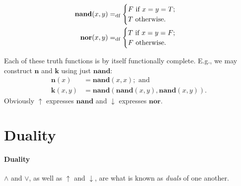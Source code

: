 \begin{definition}
	\begin{align*}
		\mathbf{nand}(x,y) =_{\text{df}} \begin{cases}
			F \text{ if } x=y=T;\\
			T \text{ otherwise}.
		\end{cases}\\
		\mathbf{nor}(x,y) =_{\text{df}} \begin{cases}
			T \text{ if } x=y=F;\\
			F \text{ otherwise}.
		\end{cases}
	\end{align*}
\end{definition}
Each of these truth functions is by itself functionally complete. E.g., we may construct $\mathbf{n}$ and $\mathbf{k}$ using just $\mathbf{nand}$: \begin{align*}
	\mathbf{n}(x) &= \mathbf{nand}(x,x); \text{ and}\\ 
	\mathbf{k}(x,y) &= \mathbf{nand}(\mathbf{nand}(x,y),\mathbf{nand}(x,y)).
\end{align*} Obviously $\uparrow$ expresses $\mathbf{nand}$ and $\downarrow$ expresses $\mathbf{nor}$.

\section{Duality}
\paragraph{Duality}

$\wedge$ and $\vee$, as well as $\uparrow$ and $\downarrow$, are what is known as \emph{duals} of one another. 

